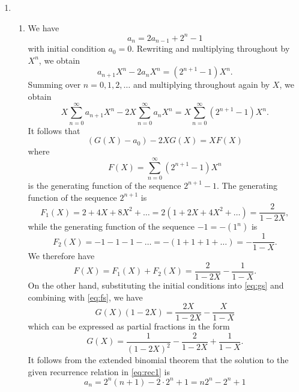 \documentclass[a4paper]{article}
\begin{document}
\begin{enumerate}
		\item
		\begin{enumerate}
			\item We have
			\begin{equation}
				a_n = 2 a_{n - 1} + 2^n - 1 \label{eq:rec1}
			\end{equation}
			with initial condition $a_0 = 0$. Rewriting and multiplying throughout by $X^n$, we obtain
			\begin{equation*}
				a_{n + 1} X^n - 2 a_{n} X^n = \left( 2^{n + 1} - 1 \right) X^n.
			\end{equation*}
			Summing over $n = 0, 1, 2, \ldots$ and multiplying throughout again by $X$, we obtain
			\begin{equation*}
				X \sum\limits_{n = 0}^{\infty} a_{n + 1} X^n - 2 X \sum\limits_{n = 0}^{\infty} a_{n} X^n = X \sum\limits_{n = 0}^{\infty} \left( 2^{n + 1} - 1 \right) X^n.
			\end{equation*}
			It follows that
			\begin{equation}
				(G(X) - a_0) - 2 X G(X) = X F(X) \label{eq:gs}
			\end{equation}
			where
			\begin{equation*}
				F(X) = \sum\limits_{n = 0}^{\infty} \left( 2^{n + 1} - 1 \right) X^n
			\end{equation*}
			is the generating function of the sequence $2^{n + 1} - 1$. The generating function of the sequence $2^{n + 1}$ is
			\begin{equation*}
				F_1(X) = 2 + 4 X + 8 X^2 + \ldots = 2 (1 + 2 X + 4 X^2 + \ldots) = \frac{2}{1 - 2 X},
			\end{equation*}
			while the generating function of the sequence $-1 = - (1^n)$ is
			\begin{equation*}
				F_2(X) = - 1 - 1 - 1 - \ldots = - (1 + 1 + 1 + \ldots) = - \frac{1}{1 - X}.
			\end{equation*}
			We therefore have
			\begin{equation}
				F(X) = F_1(X) + F_2(X) = \frac{2}{1 - 2 X} - \frac{1}{1 - X}. \label{eq:fs}
			\end{equation}
			On the other hand, substituting the initial conditions into \eqref{eq:gs} and combining with \eqref{eq:fs}, we have
			\begin{equation*}
				G(X) (1 - 2 X) = \frac{2 X}{1 - 2 X} - \frac{X}{1 - X}
			\end{equation*}
			which can be expressed as partial fractions in the form
			\begin{equation*}
				G(X) = \frac{1}{(1 - 2 X)^2} - \frac{2}{1 - 2 X} + \frac{1}{1 - X}.
			\end{equation*}
			It follows from the extended binomial theorem that the solution to the given recurrence relation in \eqref{eq:rec1} is
			\begin{equation*}
				a_n = 2^n (n + 1) - 2 \cdot 2^n + 1 = n 2^n - 2^n + 1
			\end{equation*}
			

\end{enumerate}
\end{enumerate}
\end{document}
